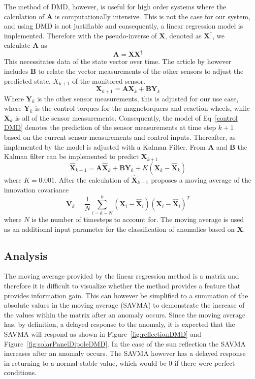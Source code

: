 The method of DMD, however, is useful for high order systems where the calculation of $\mathbf{A}$ is computationally intensive. This is not the case for our system, and using DMD is not justifiable and consequently, a linear regression model is implemented. Therefore with the pseudo-inverse of $\mathbf{X}$, denoted as $\mathbf{X^{\dagger}}$, we calculate $\mathbf{A}$ as
\begin{equation}
	\mathbf{A} = \mathbf{X}\mathbf{X^{\dagger}}
\end{equation}
This necessitates data of the state vector over time. The article by \cite{DeSilva2020} however includes $\mathbf{B}$ to relate the vector measurements of the other sensors to adjust the predicted state, $X_{k+1}$ of the monitored sensor. 
\begin{equation}
	\mathbf{X}_{k+1} = \mathbf{AX}_k + \mathbf{BY}_k
	\label{control DMD}
\end{equation}
Where $\mathbf{Y}_k$ is the other sensor measurements, this is adjusted for our use case, where $\mathbf{Y}_k$ is the control torques for the magnetorquers and reaction wheels, while $\mathbf{X}_k$ is all of the sensor measurements. Consequently, the model of Eq~\ref{control DMD} denotes the prediction of the sensor measurements at time step $k+1$ based on the current sensor measurements and control inputs.
Thereafter, as implemented by \cite{DeSilva2020} the model is adjusted with a Kalman Filter. From $\mathbf{A}$ and $\mathbf{B}$ the Kalman filter can be implemented to predict $\mathbf{X}_{k+1}$
\begin{equation}
	\hat{\mathbf{X}}_{k+1} = \mathbf{A}\hat{\mathbf{X}}_k + \mathbf{B}\mathbf{Y}_k + K(\mathbf{X}_k - \hat{\mathbf{X}}_k)
\end{equation}
where $K = 0.001$. After the calculation of $\hat{\mathbf{X}}_{k+1}$ \cite{DeSilva2020} proposes a moving average of the innovation covariance
\begin{equation}
	\mathbf{V}_k = \frac{1}{N} \sum_{i=k-N}^k (\mathbf{X}_i - \hat{\mathbf{X}}_i)(\mathbf{X}_i - \hat{\mathbf{X}}_i)^T
\end{equation}
where $N$ is the number of timesteps to account for. The moving average is used as an additional input parameter for the classification of anomalies based on $\mathbf{X}$.

\subsection{Analysis}
The moving average provided by the linear regression method is a matrix and therefore it is difficult to visualize whether the method provides a feature that provides information gain. This can however be simplified to a summation of the absolute values in the moving average (SAVMA) to demonstrate the increase of the values within the matrix after an anomaly occurs. Since the moving average has, by definition, a delayed response to the anomaly, it is expected that the SAVMA will respond as shown in Figure~\ref{fig:reflectionDMD} and Figure~\ref{fig:solarPanelDipoleDMD}. In the case of the sun reflection the SAVMA increases after an anomaly occurs. The SAVMA however has a delayed response in returning to a normal stable value, which would be $0$ if there were perfect conditions.

